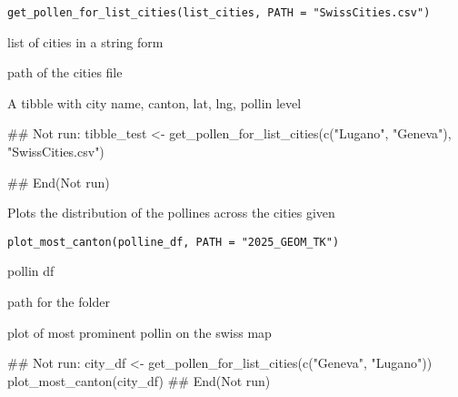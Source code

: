 \documentclass[letterpaper]{book}
\begin{document}
%
\begin{Usage}
\begin{verbatim}
get_pollen_for_list_cities(list_cities, PATH = "SwissCities.csv")
\end{verbatim}
\end{Usage}
%
\begin{Arguments}
\begin{ldescription}
\item[\code{list\_cities}] list of cities in a string form

\item[\code{PATH}] path of the cities file
\end{ldescription}
\end{Arguments}
%
\begin{Value}
A tibble with city name, canton, lat, lng, pollin level
\end{Value}
%
\begin{Examples}
\begin{ExampleCode}
## Not run: 
tibble_test <- get_pollen_for_list_cities(c("Lugano", "Geneva"), "SwissCities.csv")

## End(Not run)

\end{ExampleCode}
\end{Examples}
%
\begin{Description}
Plots the distribution of the pollines across the cities given
\end{Description}
%
\begin{Usage}
\begin{verbatim}
plot_most_canton(polline_df, PATH = "2025_GEOM_TK")
\end{verbatim}
\end{Usage}
%
\begin{Arguments}
\begin{ldescription}
\item[\code{polline\_df}] pollin df

\item[\code{PATH}] path for the folder
\end{ldescription}
\end{Arguments}
%
\begin{Value}
plot of most prominent pollin on the swiss map
\end{Value}
%
\begin{Examples}
\begin{ExampleCode}
## Not run: 
city_df <- get_pollen_for_list_cities(c("Geneva", "Lugano"))
plot_most_canton(city_df)
## End(Not run)

\end{ExampleCode}
\end{Examples}
\end{document}
